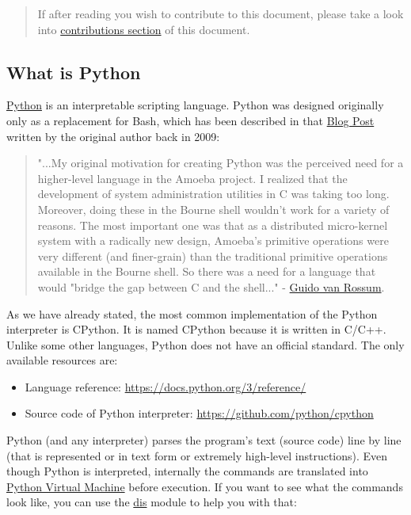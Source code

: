 \documentclass[
]{article}
\begin{document}
\begin{quote}
If after reading you wish to contribute to this document, please take a
look into
\protect\hyperlink{contributions-to-this-document}{contributions
section} of this document.
\end{quote}

\hypertarget{what-is-python}{%
\subsection{What is Python}\label{what-is-python}}

\href{https://www.python.org/}{Python} is an interpretable scripting
language. Python was designed originally only as a replacement for Bash,
which has been described in that
\href{https://python-history.blogspot.com/2009/01/personal-history-part-1-cwi.html?fbclid=IwAR1v3C4KHiJtBbG4NYVY2o__lMchCNVKQGe2ozoI-gcxnwCYNvcdxzD_sHU}{Blog
Post} written by the original author back in 2009:

\begin{quote}
"...My original motivation for creating Python was the perceived need
for a higher-level language in the Amoeba project. I realized that the
development of system administration utilities in C was taking too long.
Moreover, doing these in the Bourne shell wouldn't work for a variety of
reasons. The most important one was that as a distributed micro-kernel
system with a radically new design, Amoeba's primitive operations were
very different (and finer-grain) than the traditional primitive
operations available in the Bourne shell. So there was a need for a
language that would "bridge the gap between C and the shell..." -
\href{https://en.wikipedia.org/wiki/Guido_van_Rossum}{Guido van Rossum}.
\end{quote}

As we have already stated, the most common implementation of the Python
interpreter is CPython. It is named CPython because it is written in
C/C++. Unlike some other languages, Python does not have an official
standard. The only available resources are:

\begin{itemize}
\item
  Language reference: \url{https://docs.python.org/3/reference/}
\item
  Source code of Python interpreter:
  \url{https://github.com/python/cpython}
\end{itemize}

Python (and any interpreter) parses the program's text (source code)
line by line (that is represented or in text form or extremely
high-level instructions). Even though Python is interpreted, internally
the commands are translated into
\href{https://docs.python.org/3/glossary.html\#term-virtual-machine}{Python
Virtual Machine} before execution. If you want to see what the commands
look like, you can use the
\href{https://docs.python.org/3/library/dis.html\#module-dis}{dis}
module to help you with that:
\end{document}
